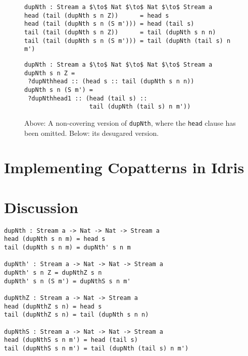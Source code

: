 \begin{figure}
\begin{lstlisting}[mathescape]
dupNth : Stream a $\to$ Nat $\to$ Nat $\to$ Stream a
head (tail (dupNth s n Z))      = head s
head (tail (dupNth s n (S m'))) = head (tail s)
tail (tail (dupNth s n Z))      = tail (dupNth s n n)
tail (tail (dupNth s n (S m'))) = tail (dupNth (tail s) n m')
\end{lstlisting}
\begin{lstlisting}[mathescape]
dupNth : Stream a $\to$ Nat $\to$ Nat $\to$ Stream a
dupNth s n Z = 
 ?dupNthhead :: (head s :: tail (dupNth s n n))
dupNth s n (S m') = 
 ?dupNthhead1 :: (head (tail s) :: 
                  tail (dupNth (tail s) n m'))
\end{lstlisting}

  \caption{Above: A non-covering version of \texttt{dupNth}, where the \texttt{head}
    clause has been omitted. Below: its desugared version.}
  \label{fig:dupNth_partial}
\end{figure}


\section{Implementing Copatterns in Idris}



\section{Discussion}

\begin{lstlisting}[mathescape]
dupNth : Stream a -> Nat -> Nat -> Stream a
head (dupNth s n m) = head s
tail (dupNth s n m) = dupNth' s n m

dupNth' : Stream a -> Nat -> Nat -> Stream a
dupNth' s n Z = dupNthZ s n
dupNth' s n (S m') = dupNthS s n m'

dupNthZ : Stream a -> Nat -> Stream a
head (dupNthZ s n) = head s
tail (dupNthZ s n) = tail (dupNth s n n)

dupNthS : Stream a -> Nat -> Nat -> Stream a
head (dupNthS s n m') = head (tail s)
tail (dupNthS s n m') = tail (dupNth (tail s) n m')
\end{lstlisting}

